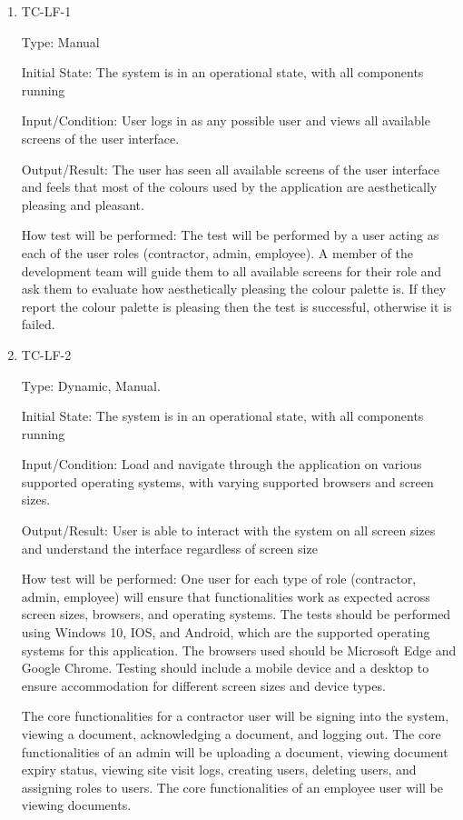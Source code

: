 \documentclass[12pt, titlepage]{article}
\begin{document}
\begin{enumerate}

  \item{TC-LF-1\\}

    Type: Manual

    Initial State: The system is in an operational state, with all
    components running

    Input/Condition: User logs in as any possible user and views all
    available screens of
    the user interface.

    Output/Result: The user has seen all available screens of the
    user interface and feels that most of the colours used by the
    application are aesthetically pleasing and pleasant.

    How test will be performed: The test will be performed by
    a user acting as each of the user roles (contractor, admin,
    employee). A member of the
    development team will guide them to all available screens for their role and
    ask them to evaluate how aesthetically pleasing the colour palette is.
    If they report the colour palette is pleasing then the test is
    successful, otherwise it is failed.

  \item{TC-LF-2\\}

    Type: Dynamic, Manual.

    Initial State: The system is in an operational state, with all
    components running

    Input/Condition: Load and navigate through the application on
    various supported operating systems, with varying supported
    browsers and screen sizes.

    Output/Result: User is able to interact with the system on all screen
    sizes and understand the interface regardless of screen size

    How test will be performed: One user for each type of role
    (contractor, admin, employee) will ensure that
    functionalities work as expected across screen sizes, browsers,
    and operating systems. The tests should be performed using
    Windows 10, IOS, and Android, which are the supported operating
    systems for this application. The browsers used should be
    Microsoft Edge and Google Chrome. Testing should include a mobile
    device and a desktop to ensure accommodation for
    different screen sizes and device types.

    The core functionalities for a contractor user will be
    signing into the system, viewing a document, acknowledging a document,
    and logging out. The core functionalities of an admin will be
    uploading a document, viewing document expiry status, viewing
    site visit logs, creating users, deleting users,
    and assigning roles to users. The core
    functionalities of an employee user will be viewing documents.

\end{enumerate}
\end{document}
